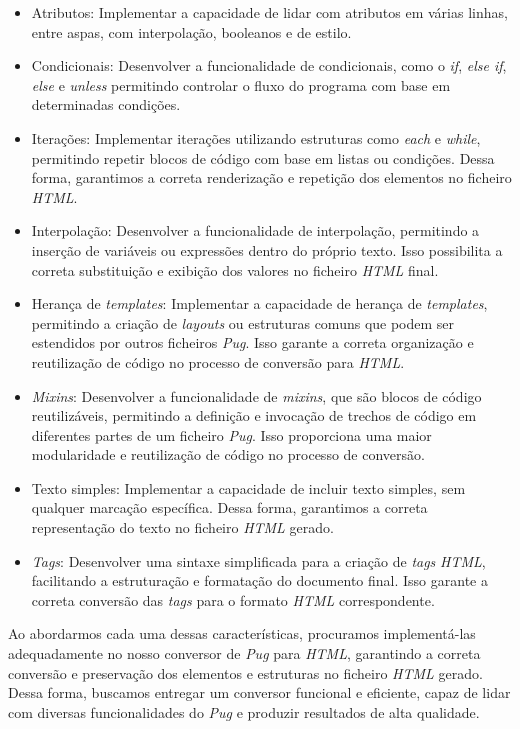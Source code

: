 \documentclass[11pt,a4paper]{report}%
\begin{document}
\begin{itemize}
    \item Atributos: Implementar a capacidade de lidar com atributos em várias linhas, entre aspas, com interpolação, booleanos e de estilo.
    \item Condicionais: Desenvolver a funcionalidade de condicionais, como o \textit{if}, \textit{else if}, \textit{else} e \textit{unless} permitindo controlar o fluxo do programa com base em determinadas condições.
    \item Iterações: Implementar iterações utilizando estruturas como \textit{each} e \textit{while}, permitindo repetir blocos de código com base em listas ou condições. Dessa forma, garantimos a correta renderização e repetição dos elementos no ficheiro \textit{HTML}.
    \item Interpolação: Desenvolver a funcionalidade de interpolação, permitindo a inserção de variáveis ou expressões dentro do próprio texto. Isso possibilita a correta substituição e exibição dos valores no ficheiro \textit{HTML} final.
    \item Herança de \textit{templates}: Implementar a capacidade de herança de \textit{templates}, permitindo a criação de \textit{layouts} ou estruturas comuns que podem ser estendidos por outros ficheiros \textit{Pug}. Isso garante a correta organização e reutilização de código no processo de conversão para \textit{HTML}.
    \item \textit{Mixins}: Desenvolver a funcionalidade de \textit{mixins}, que são blocos de código reutilizáveis, permitindo a definição e invocação de trechos de código em diferentes partes de um ficheiro \textit{Pug}. Isso proporciona uma maior modularidade e reutilização de código no processo de conversão.
    \item Texto simples: Implementar a capacidade de incluir texto simples, sem qualquer marcação específica. Dessa forma, garantimos a correta representação do texto no ficheiro \textit{HTML} gerado.
    \item \textit{Tags}: Desenvolver uma sintaxe simplificada para a criação de \textit{tags} \textit{HTML}, facilitando a estruturação e formatação do documento final. Isso garante a correta conversão das \textit{tags} para o formato \textit{HTML} correspondente.
\end{itemize}

Ao abordarmos cada uma dessas características, procuramos implementá-las adequadamente no nosso conversor de \textit{Pug} para \textit{HTML}, garantindo a correta conversão e preservação dos elementos e estruturas no ficheiro \textit{HTML} gerado. Dessa forma, buscamos entregar um conversor funcional e eficiente, capaz de lidar com diversas funcionalidades do \textit{Pug} e produzir resultados de alta qualidade.
\end{document}
